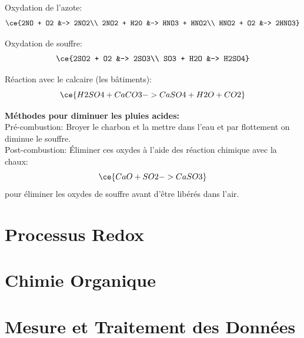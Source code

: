\documentclass[french, a4paper, 12pt]{article}
\begin{document}
Oxydation de l'azote:
\begin{align*}
\ce{2NO + O2 &-> 2NO2\\
2NO2 + H20 &-> HNO3 + HNO2\\
HNO2 + O2 &-> 2HNO3}
\end{align*}

Oxydation de souffre:
\begin{align*}
\ce{2SO2 + O2 &-> 2SO3\\
SO3 + H2O &-> H2SO4}
\end{align*}

Réaction avec le calcaire (les bâtiments):
\[
\ce{H2SO4 + CaCO3 -> CaSO4 + H2O + CO2}
\]

\vspace{0.5em}
\textbf{Méthodes pour diminuer les pluies acides:}\\
Pré-combustion: Broyer le charbon et la mettre dans l'eau et par flottement on diminue le souffre.\\
Post-combustion: Éliminer ces oxydes à l'aide des réaction chimique avec la chaux:
\[
\ce{CaO + SO2 -> CaSO3}
\]
pour éliminer les oxydes de souffre avant d'être libérés dans l'air.
\pagebreak

\section{Processus Redox}
\pagebreak

\section{Chimie Organique}
\pagebreak

\section{Mesure et Traitement des Données}
\pagebreak
\end{document}
